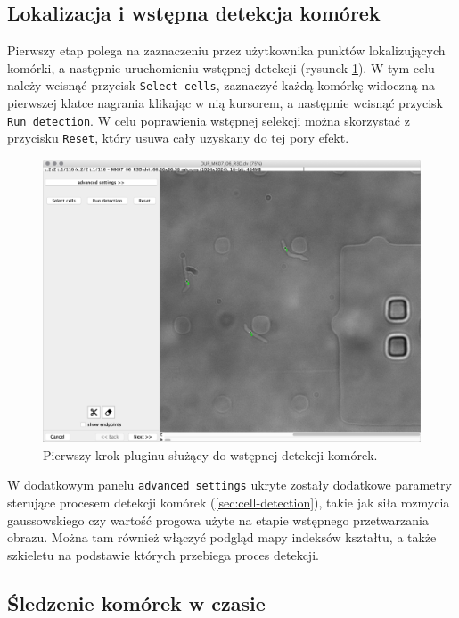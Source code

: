\documentclass[declaration,shortabstract,mgr]{iithesis}
\begin{document}
\subsection{Lokalizacja i wstępna detekcja komórek}

Pierwszy etap polega na zaznaczeniu przez użytkownika punktów lokalizujących komórki, a następnie uruchomieniu wstępnej detekcji (rysunek \ref{fig:ui-step-detector}).
W tym celu należy wcisnąć przycisk \texttt{Select cells}, zaznaczyć każdą komórkę widoczną na pierwszej klatce nagrania klikając w nią kursorem, a następnie wcisnąć przycisk \texttt{Run detection}.
W celu poprawienia wstępnej selekcji można skorzystać z przycisku \texttt{Reset}, który usuwa cały uzyskany do tej pory efekt.

\begin{figure}
  \centering
  \includegraphics[width=\textwidth]{images/ui-step-detector.png}
  \caption{Pierwszy krok pluginu służący do wstępnej detekcji komórek.}
  \label{fig:ui-step-detector}
\end{figure}

W dodatkowym panelu \texttt{advanced settings} ukryte zostały dodatkowe parametry sterujące procesem detekcji komórek (\ref{sec:cell-detection}), takie jak siła rozmycia gaussowskiego czy wartość progowa użyte na etapie wstępnego przetwarzania obrazu.
Można tam również włączyć podgląd mapy indeksów kształtu, a także szkieletu na podstawie których przebiega proces detekcji.

\subsection{Śledzenie komórek w czasie}
\end{document}
